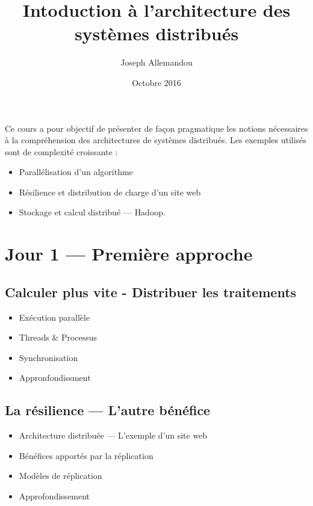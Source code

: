 \documentclass[utf8,12pt,draft]{article}
\begin{document}

\title{\LARGE\bfseries Intoduction \`a l'architecture des syst\`emes distribu\'es}
\author{Joseph Allemandou}
\date{Octobre 2016}
\maketitle

Ce cours a pour objectif de pr\'esenter de fa\c{c}on pragmatique les notions
n\'ecessaires \`a la compr\'ehension des architectures de syst\`emes
distribu\'es. Les exemples utilis\'es sont de complexit\'e croissante :
\begin{itemize}
\item Parall\'elisation d'un algorithme
\item R\'esilience et distribution de charge d'un site web
\item Stockage et calcul distribu\'e --- {\sc Hadoop}.
\end{itemize}

\section{Jour 1 --- Premi\`ere approche}

\subsection{Calculer plus vite - Distribuer les traitements}
\begin{itemize}
\item Ex\'ecution parall\`ele \cite{wikipara} \cite{wikiconcur} \cite{wikimultitache}
\item Threads \& Processus\cite{wikithread} \cite{wikiproc}
\item Synchronisation \cite{wikisync} \cite{wikideadlock}
\item Appronfondissment \cite{wikiordo} \cite{wikicomproc} \cite{wikiverrou}
                        \cite{wikisema} \cite{wikiexclu} \cite{wikisection}
                        \cite{wikiprodcons} \cite{wikilectred}
\end{itemize}


\subsection{La r\'esilience --- L'autre b\'en\'efice}
\begin{itemize}
\item Architecture distribu\'ee \cite{wikiarchidist} --- L'exemple d'un site web
\item B\'en\'efices apport\'es par la r\'eplication \cite{wikirepli} \cite{wikispof} \cite{wikiloadbal}
\item Mod\`eles de r\'eplication \cite{wikimasterslave} \cite{wikimultimaster}
\item Approfondissement \cite{wikicap} \cite{wikiconsensus} \cite{wikipaxos}
                        \cite{wikisplitbrain} \cite{wikiillus}
\end{itemize}
\end{document}
